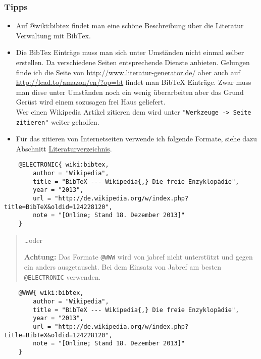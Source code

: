 \subsubsection{Tipps}\label{tipps}

\begin{itemize}
\item
  Auf @wiki:bibtex findet man eine schöne Beschreibung über die
  Literatur Verwaltung mit BibTex.
\item
  Die BibTex Einträge muss man sich unter Umständen nicht einmal selber
  erstellen. Da verschiedene Seiten entsprechende Dienste anbieten.
  Gelungen finde ich die Seite von
  \url{http://www.literatur-generator.de/} aber auch auf
  \url{http://lead.to/amazon/en/?op=bt} findet man BibTeX Einträge. Zwar
  muss man diese unter Umständen noch ein wenig überarbeiten aber das
  Grund Gerüst wird einem sozusagen frei Haus geliefert.\\Wer einen
  Wikipedia Artikel zitieren dem wird unter
  \texttt{"Werkzeuge -\textgreater{} Seite zitieren"} weiter geholfen.
\item
  Für das zitieren von Internetseiten verwende ich folgende Formate,
  siehe dazu Abschnitt
  \hyperref[literaturverzeichnis]{Literaturverzeichnis}.
\end{itemize}

\begin{verbatim}
    @ELECTRONIC{ wiki:bibtex,
        author = "Wikipedia",
        title = "BibTeX --- Wikipedia{,} Die freie Enzyklopädie",
        year = "2013",
        url = "http://de.wikipedia.org/w/index.php?title=BibTeX&oldid=124228120", 
        note = "[Online; Stand 18. Dezember 2013]"
    }
\end{verbatim}

\begin{quote}
\ldots{}oder

\textbf{Achtung:} Das Formate \texttt{@WWW} wird von jabref nicht
unterstützt und gegen ein anders ausgetauscht. Bei dem Einsatz von
Jabref am besten \texttt{@ELECTRONIC} verwenden.
\end{quote}

\begin{verbatim}
    @WWW{ wiki:bibtex,
        author = "Wikipedia",
        title = "BibTeX --- Wikipedia{,} Die freie Enzyklopädie",
        year = "2013",
        url = "http://de.wikipedia.org/w/index.php?title=BibTeX&oldid=124228120", 
        note = "[Online; Stand 18. Dezember 2013]"
    }
\end{verbatim}

